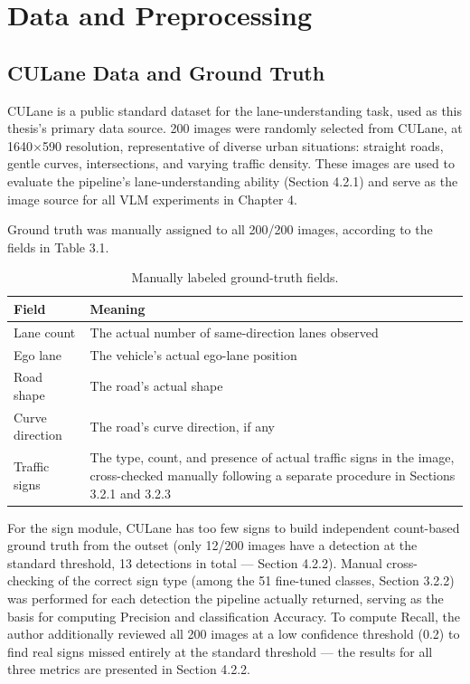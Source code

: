 \documentclass[12pt,a4paper]{report}
\begin{document}
\section{Data and Preprocessing}

\subsection{CULane Data and Ground Truth}

CULane \cite{pan2018culane} is a public standard dataset for the lane-understanding task, used as this thesis's primary data source. 200 images were randomly selected from CULane, at 1640$\times$590 resolution, representative of diverse urban situations: straight roads, gentle curves, intersections, and varying traffic density. These images are used to evaluate the pipeline's lane-understanding ability (Section 4.2.1) and serve as the image source for all VLM experiments in Chapter 4.

Ground truth was manually assigned to all 200/200 images, according to the fields in Table 3.1.

\begin{table}[htbp]
    \centering
    \small
    \caption{Manually labeled ground-truth fields.}
    \label{tab:3.1}
    \begin{tabularx}{\linewidth}{@{}lX@{}}
        \toprule
        \textbf{Field} & \textbf{Meaning} \\
        \midrule
        Lane count & The actual number of same-direction lanes observed \\
        Ego lane & The vehicle's actual ego-lane position \\
        Road shape & The road's actual shape \\
        Curve direction & The road's curve direction, if any \\
        Traffic signs & The type, count, and presence of actual traffic signs in the image, cross-checked manually following a separate procedure in Sections 3.2.1 and 3.2.3 \\
        \bottomrule
    \end{tabularx}
\end{table}

For the sign module, CULane has too few signs to build independent count-based ground truth from the outset (only 12/200 images have a detection at the standard threshold, 13 detections in total --- Section 4.2.2). Manual cross-checking of the correct sign type (among the 51 fine-tuned classes, Section 3.2.2) was performed for each detection the pipeline actually returned, serving as the basis for computing Precision and classification Accuracy. To compute Recall, the author additionally reviewed all 200 images at a low confidence threshold (0.2) to find real signs missed entirely at the standard threshold --- the results for all three metrics are presented in Section 4.2.2.
\end{document}

